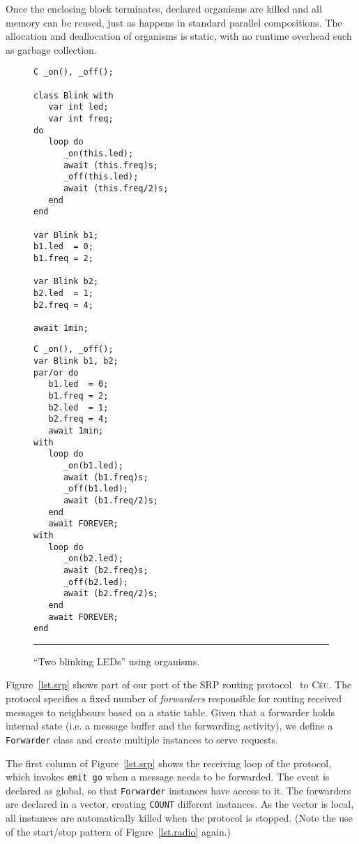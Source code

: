 \documentclass[10pt]{sensys-proc}
\newcommand{\CEU}{\textsc{C\'{e}u}\xspace}
\newcommand{\code}[1] {{\small{\texttt{#1}}}}
\begin{document}
Once the enclosing block terminates, declared organisms are killed and all 
memory can be reused, just as happens in standard parallel compositions.
The allocation and deallocation of organisms is static, with no runtime 
overhead such as garbage collection.

\begin{figure}[t]
\begin{minipage}[t]{0.45\linewidth}
{\small
\begin{verbatim}
C _on(), _off();

class Blink with
   var int led;
   var int freq;
do
   loop do
      _on(this.led);
      await (this.freq)s;
      _off(this.led);
      await (this.freq/2)s;
   end
end

var Blink b1;
b1.led  = 0;
b1.freq = 2;

var Blink b2;
b2.led  = 1;
b2.freq = 4;

await 1min;
\end{verbatim}
}
\end{minipage}
%
\hspace{0.0cm}
%
\begin{minipage}[t]{0.45\linewidth}
{\small
\begin{verbatim}
C _on(), _off();
var Blink b1, b2;
par/or do
   b1.led  = 0;
   b1.freq = 2;
   b2.led  = 1;
   b2.freq = 4;
   await 1min;
with
   loop do
      _on(b1.led);
      await (b1.freq)s;
      _off(b1.led);
      await (b1.freq/2)s;
   end
   await FOREVER;
with
   loop do
      _on(b2.led);
      await (b2.freq)s;
      _off(b2.led);
      await (b2.freq/2)s;
   end
   await FOREVER;
end
\end{verbatim}
}
\end{minipage}
\rule{8.5cm}{0.37pt}
\caption{ ``Two blinking LEDs'' using organisms.
\label{lst.orgs}
}
\end{figure}

Figure~\ref{lst.srp} shows part of our port of the SRP routing 
protocol~\cite{wsn.teps} to \CEU.
The protocol specifies a fixed number of \emph{forwarders} responsible for 
routing received messages to neighbours based on a static table.
Given that a forwarder holds internal state (i.e. a message buffer and the 
forwarding activity), we define a \code{Forwarder} class and create multiple 
instances to serve requests.

The first column of Figure~\ref{lst.srp} shows the receiving loop of the 
protocol, which invokes \code{emit~go} when a message needs to be forwarded.
The event is declared as global, so that \code{Forwarder} instances have access 
to it.
The forwarders are declared in a vector, creating \code{COUNT} different 
instances.
As the vector is local, all instances are automatically killed when the 
protocol is stopped.
(Note the use of the start/stop pattern of Figure~\ref{lst.radio} again.)
\end{document}
